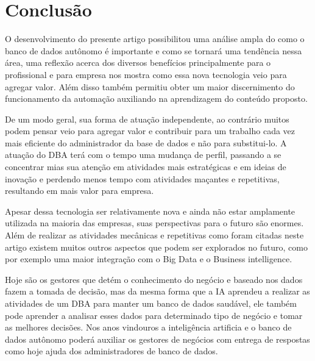 \chapter{Conclusão}

O desenvolvimento do presente artigo possibilitou uma análise ampla do como o banco de dados autônomo é importante e como se tornará uma tendência nessa área, uma reflexão acerca dos diversos benefícios principalmente para o profissional e para empresa nos mostra como essa nova tecnologia veio para agregar valor. Além disso também permitiu obter um maior discernimento do funcionamento da automação auxiliando na aprendizagem do conteúdo proposto. 

De um modo geral, sua forma de atuação independente, ao contrário muitos podem pensar veio para agregar valor e contribuir para um trabalho cada vez mais eficiente do administrador da base de dados e não para substitui-lo. A atuação do DBA terá com o tempo uma mudança de perfil, passando a se concentrar mias sua atenção em atividades mais estratégicas e em ideias de inovação e perdendo menos tempo com atividades maçantes e repetitivas, resultando em mais valor para empresa. 

Apesar dessa tecnologia ser relativamente nova e ainda não estar amplamente utilizada na maioria das empresas, suas perspectivas para o futuro são enormes. Além de realizar as atividades mecânicas e repetitivas como foram citadas neste artigo existem muitos outros aspectos que podem ser explorados no futuro, como por exemplo uma maior integração com o Big Data e o Business intelligence.

Hoje são os gestores que detém o conhecimento do negócio e baseado nos dados fazem a tomada de decisão, mas da mesma forma que a IA aprendeu a realizar as atividades de um DBA para manter um banco de dados saudável, ele também pode aprender a analisar esses dados para determinado tipo de negócio e tomar as melhores decisões. Nos anos vindouros a inteligência artificia e o banco de dados autônomo poderá auxiliar os gestores de negócios com entrega de respostas como hoje ajuda dos administradores de banco de dados.
